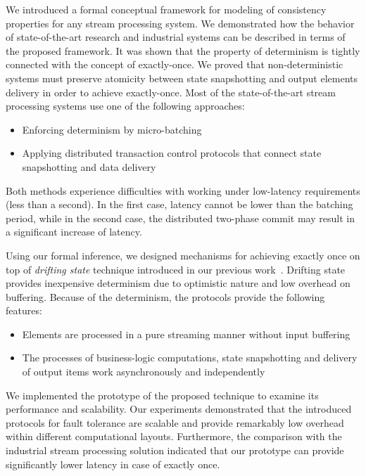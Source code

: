 
\label {fs-conclusion-seciton}

We introduced a formal conceptual framework for modeling of consistency properties for any stream processing system. We demonstrated how the behavior of state-of-the-art research and industrial systems can be described in terms of the proposed framework. It was shown that the property of determinism is tightly connected with the concept of exactly-once. We proved that non-deterministic systems must preserve atomicity between state snapshotting and output elements delivery in order to achieve exactly-once. Most of the state-of-the-art stream processing systems use one of the following approaches: 

\begin{itemize}
    \item Enforcing determinism by micro-batching
    \item Applying distributed transaction control protocols that connect state snapshotting and data delivery
\end{itemize}

Both methods experience difficulties with working under low-latency requirements (less than a second). In the first case, latency cannot be lower than the batching period, while in the second case, the distributed two-phase commit may result in a significant increase of latency.

Using our formal inference, we designed mechanisms for achieving exactly once on top of {\em drifting state} technique introduced in our previous work~\cite{we2018adbis}. Drifting state provides inexpensive determinism due to optimistic nature and low overhead on buffering. Because of the determinism, the protocols provide the following features:

\begin{itemize}
    \item Elements are processed in a pure streaming manner without input buffering
    \item The processes of business-logic computations, state snapshotting and delivery of output items work asynchronously and independently
\end{itemize}

We implemented the prototype of the proposed technique to examine its performance and scalability. Our experiments demonstrated that the introduced protocols for fault tolerance are scalable and provide remarkably low overhead within different computational layouts. Furthermore, the comparison with the industrial stream processing solution indicated that our prototype can provide significantly lower latency in case of exactly once.